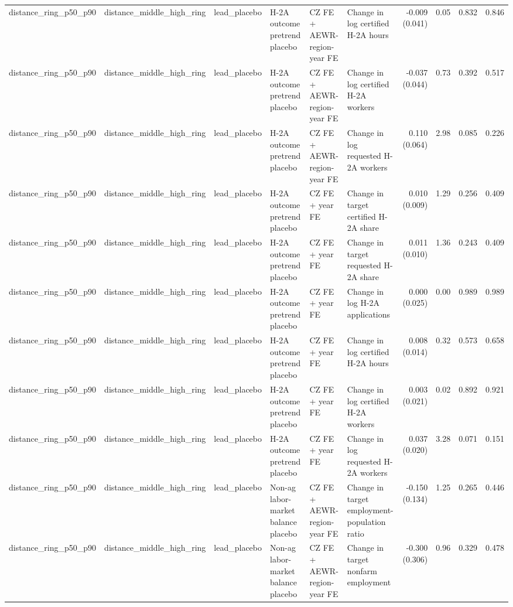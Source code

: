 \begin{tabular}{llllllrrrr}
distance_ring_p50_p90 & distance_middle_high_ring & lead_placebo & H-2A outcome pretrend placebo & CZ FE + AEWR-region-year FE & Change in log certified H-2A hours & -0.009 (0.041) & 0.05 & 0.832 & 0.846 \\
distance_ring_p50_p90 & distance_middle_high_ring & lead_placebo & H-2A outcome pretrend placebo & CZ FE + AEWR-region-year FE & Change in log certified H-2A workers & -0.037 (0.044) & 0.73 & 0.392 & 0.517 \\
distance_ring_p50_p90 & distance_middle_high_ring & lead_placebo & H-2A outcome pretrend placebo & CZ FE + AEWR-region-year FE & Change in log requested H-2A workers & 0.110 (0.064) & 2.98 & 0.085 & 0.226 \\
distance_ring_p50_p90 & distance_middle_high_ring & lead_placebo & H-2A outcome pretrend placebo & CZ FE + year FE & Change in target certified H-2A share & 0.010 (0.009) & 1.29 & 0.256 & 0.409 \\
distance_ring_p50_p90 & distance_middle_high_ring & lead_placebo & H-2A outcome pretrend placebo & CZ FE + year FE & Change in target requested H-2A share & 0.011 (0.010) & 1.36 & 0.243 & 0.409 \\
distance_ring_p50_p90 & distance_middle_high_ring & lead_placebo & H-2A outcome pretrend placebo & CZ FE + year FE & Change in log H-2A applications & 0.000 (0.025) & 0.00 & 0.989 & 0.989 \\
distance_ring_p50_p90 & distance_middle_high_ring & lead_placebo & H-2A outcome pretrend placebo & CZ FE + year FE & Change in log certified H-2A hours & 0.008 (0.014) & 0.32 & 0.573 & 0.658 \\
distance_ring_p50_p90 & distance_middle_high_ring & lead_placebo & H-2A outcome pretrend placebo & CZ FE + year FE & Change in log certified H-2A workers & 0.003 (0.021) & 0.02 & 0.892 & 0.921 \\
distance_ring_p50_p90 & distance_middle_high_ring & lead_placebo & H-2A outcome pretrend placebo & CZ FE + year FE & Change in log requested H-2A workers & 0.037 (0.020) & 3.28 & 0.071 & 0.151 \\
distance_ring_p50_p90 & distance_middle_high_ring & lead_placebo & Non-ag labor-market balance placebo & CZ FE + AEWR-region-year FE & Change in target employment-population ratio & -0.150 (0.134) & 1.25 & 0.265 & 0.446 \\
distance_ring_p50_p90 & distance_middle_high_ring & lead_placebo & Non-ag labor-market balance placebo & CZ FE + AEWR-region-year FE & Change in target nonfarm employment & -0.300 (0.306) & 0.96 & 0.329 & 0.478 \\

\end{tabular}
